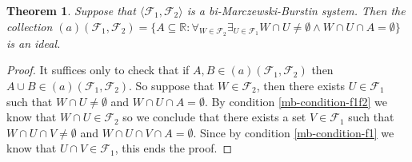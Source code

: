 \documentclass[12pt]{amsart}
\theoremstyle{plain}
\newtheorem{theorem}{Theorem}[section]
\theoremstyle{definition}
\theoremstyle{remark}
\newcommand{\real}{\mathbb{R}}
\newcommand{\cF}{{\mathcal F}}
\newcommand{\aideal}{\mathit{(a)}}
\newcommand{\biMB}{bi-Marczewski-Burstin}
\begin{document}
\begin{theorem}
Suppose that $\langle \cF_1, \cF_2 \rangle$ is a \biMB{} system.
Then the collection
$\aideal(\cF_1, \cF_2) = \lbrace A \subseteq \real\colon 
\forall_{W\in \cF_2} \exists_{U \in \cF_1}
W \cap U \not= \emptyset \wedge W \cap U \cap A = \emptyset
\rbrace$ 
is an ideal. 
\end{theorem}
\begin{proof}
It suffices only to check that if $A, B \in \aideal(\cF_1, \cF_2)$ then
$A\cup B \in \aideal(\cF_1, \cF_2)$.
So suppose that $W \in \cF_2$, then there exists $U\in\cF_1$
such that 
$W \cap U \not= \emptyset$ and $W \cap U \cap A = \emptyset$.
By condition \ref{mb-condition-f1f2} 
we know that $W \cap U \in \cF_2$ so
we conclude that
there exists a set $V \in \cF_1$ such that
$W \cap U \cap V \not= \emptyset$ and $W \cap U \cap V \cap A = \emptyset$.
Since by condition \ref{mb-condition-f1} we know that 
$U \cap V \in \cF_1$, this ends the proof.
\end{proof}
\end{document}
